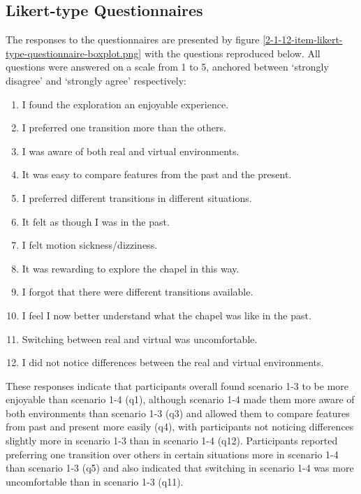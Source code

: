 \subsection{Likert-type Questionnaires}
The responses to the questionnaires are presented by figure \ref{2-1-12-item-likert-type-questionnaire-boxplot.png} with the questions reproduced below. All questions were answered on a scale from 1 to 5, anchored between `strongly disagree' and `strongly agree' respectively:
\begin{enumerate}
	\item I found the exploration an enjoyable experience.
	\item I preferred one transition more than the others.
	\item I was aware of both real and virtual environments.
	\item It was easy to compare features from the past and the present.
	\item I preferred different transitions in different situations.
	\item It felt as though I was in the past.
	\item I felt motion sickness/dizziness.
	\item It was rewarding to explore the chapel in this way.
	\item I forgot that there were different transitions available.
	\item I feel I now better understand what the chapel was like in the past.
	\item Switching between real and virtual was uncomfortable.
	\item I did not notice differences between the real and virtual environments.
\end{enumerate}

These responses indicate that participants overall found scenario 1-3 to be more enjoyable than scenario 1-4 (q1), although scenario 1-4 made them more aware of both environments than scenario 1-3 (q3) and allowed them to compare features from past and present more easily (q4), with participants not noticing differences slightly more in scenario 1-3 than in scenario 1-4 (q12). Participants reported preferring one transition over others in certain situations more in scenario 1-4 than scenario 1-3 (q5) and also indicated that switching in scenario 1-4 was more uncomfortable than in scenario 1-3 (q11).


